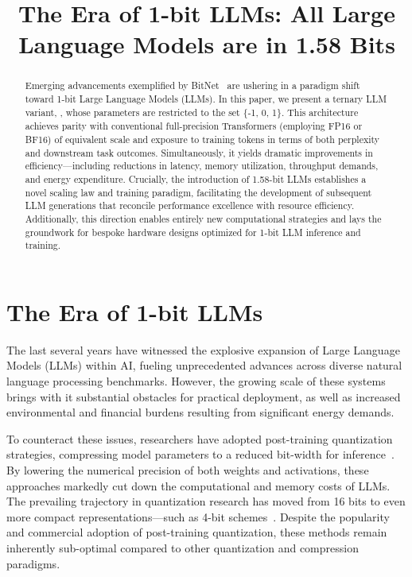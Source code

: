\title{The Era of 1-bit LLMs: All Large Language Models are in 1.58 Bits}

\begin{abstract}
Emerging advancements exemplified by BitNet~\cite{bitnet} are ushering in a paradigm shift toward 1-bit Large Language Models (LLMs). In this paper, we present a ternary LLM variant, \textbf{}, whose parameters are restricted to the set \{-1, 0, 1\}. This architecture achieves parity with conventional full-precision Transformers (employing FP16 or BF16) of equivalent scale and exposure to training tokens in terms of both perplexity and downstream task outcomes. Simultaneously, it yields dramatic improvements in efficiency—including reductions in latency, memory utilization, throughput demands, and energy expenditure. Crucially, the introduction of 1.58-bit LLMs establishes a novel scaling law and training paradigm, facilitating the development of subsequent LLM generations that reconcile performance excellence with resource efficiency. Additionally, this direction enables entirely new computational strategies and lays the groundwork for bespoke hardware designs optimized for 1-bit LLM inference and training.
\end{abstract}

\section{The Era of 1-bit LLMs}

The last several years have witnessed the explosive expansion of Large Language Models (LLMs) within AI, fueling unprecedented advances across diverse natural language processing benchmarks. However, the growing scale of these systems brings with it substantial obstacles for practical deployment, as well as increased environmental and financial burdens resulting from significant energy demands.

To counteract these issues, researchers have adopted post-training quantization strategies, compressing model parameters to a reduced bit-width for inference~\cite{smoothquant, gptq, quip, quip_sharp}. By lowering the numerical precision of both weights and activations, these approaches markedly cut down the computational and memory costs of LLMs. The prevailing trajectory in quantization research has moved from 16 bits to even more compact representations—such as 4-bit schemes~\cite{gptq, awq}. Despite the popularity and commercial adoption of post-training quantization, these methods remain inherently sub-optimal compared to other quantization and compression paradigms.

